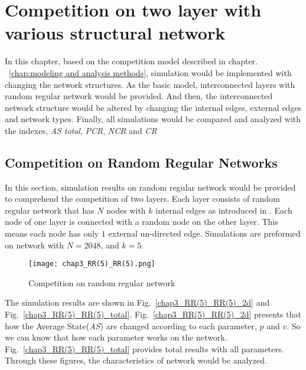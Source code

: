

\chapter{Competition on two layer with various structural network}
\label{chap:competition on two layer with various structural network}
In this chapter, based on the competition model described in chapter. ~\ref{chap:modeling and analysis methods}, simulation would be implemented with changing the network structures. As the basic model, interconnected layers with random regular network would be provided. And then, the interconnected network structure would be altered by changing the internal edges, external edges and network types. Finally, all simulations would be compared and analyzed with the indexes, \textit{AS total}, \textit{PCR}, \textit{NCR} and \textit{CR}

\section{Competition on Random Regular Networks}
\label{competition on Random Regular Networks}
In this section, simulation results on random regular network would be provided to comprehend the competition of two layers. Each layer consists of random regular network that has $N$ nodes with $k$ internal edges as introduced in \cite{kimsangwoo2012, bela2001}. Each node of one layer is connected with a random node on the other layer. This means each node has only $1$ external un-directed edge. Simulations are preformed on network with $N=2048$, and $k = 5$. 
\begin{figure*}[!htb]
	\centering
	\texttt{[image: chap3\_RR(5)\_RR(5).png]}
	\caption{Competition on random regular network}
	\label{chap3_RR(5)_RR(5)}
\end{figure*}

The simulation results are shown in Fig.~\ref{chap3_RR(5)_RR(5)_2d} and Fig.~\ref{chap3_RR(5)_RR(5)_total}.  Fig.~\ref{chap3_RR(5)_RR(5)_2d} presents that how the Average State(\textit{AS}) are changed according to each parameter, $p$ and $v$. So we can know that how each parameter works on the network. Fig.~\ref{chap3_RR(5)_RR(5)_total} provides total results with all parameters. Through these figures, the characteristics of network would be analyzed.


